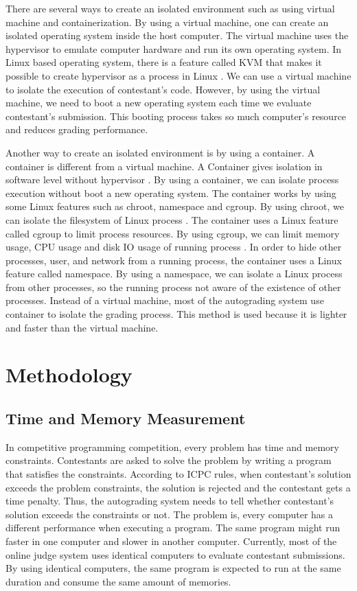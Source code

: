 \documentclass[conference]{IEEEtran}
\begin{document}
There are several ways to create an isolated environment such as using virtual machine and containerization. By using a virtual machine, one can create an isolated operating system inside the host computer. The virtual machine uses the hypervisor to emulate computer hardware and run its own operating system. In Linux based operating system, there is a feature called KVM that makes it possible to create hypervisor as a process in Linux \cite{wfeltervmcontainer}. We can use a virtual machine to isolate the execution of contestant's code. However, by using the virtual machine, we need to boot a new operating system each time we evaluate contestant's submission. This booting process takes so much computer's resource and reduces grading performance.

Another way to create an isolated environment is by using a container. A container is different from a virtual machine. A Container gives isolation in software level without hypervisor \cite{merkeldocker}. By using a container, we can isolate process execution without boot a new operating system. The container works by using some Linux features such as chroot, namespace and cgroup. By using chroot, we can isolate the filesystem of Linux process \cite{lessardchroot}. The container uses a Linux feature called cgroup to limit process resources. By using cgroup, we can limit memory usage, CPU usage and disk IO usage of running process \cite{wfeltervmcontainer}. In order to hide other processes, user, and network from a running process, the container uses a Linux feature called namespace. By using a namespace, we can isolate a Linux process from other processes, so the running process not aware of the existence of other processes. Instead of a virtual machine, most of the autograding system use container to isolate the grading process. This method is used because it is lighter and faster than the virtual machine. 

\section{Methodology}

\subsection{Time and Memory Measurement}

In competitive programming competition, every problem has time and memory constraints. Contestants are asked to solve the problem by writing a program that satisfies the constraints. According to ICPC rules, when contestant's solution exceeds the problem constraints, the solution is rejected and the contestant gets a time penalty. Thus, the autograding system needs to tell whether contestant's solution exceeds the constraints or not. The problem is, every computer has a different performance when executing a program. The same program might run faster in one computer and slower in another computer. Currently, most of the online judge system uses identical computers to evaluate contestant submissions. By using identical computers, the same program is expected to run at the same duration and consume the same amount of memories.
\end{document}
